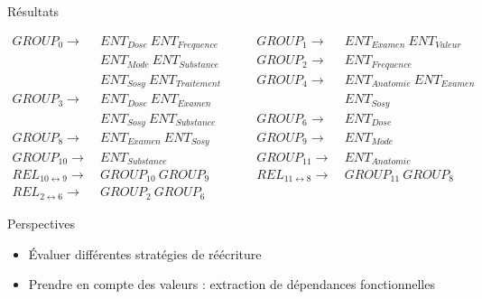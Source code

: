 \begin{frame}{Résultats}
    \begin{adjustbox}{max width=.9\textwidth}
        \centering
        \parbox{\linewidth}{\begin{align*}
            GROUP_0                     \to & ~ ENT_{Dose} ~ ENT_{Frequence}  & \qquad GROUP_1                    \to & ~ ENT_{Examen} ~ ENT_{Valeur}   \\
                                            & ~ ENT_{Mode} ~ ENT_{Substance}  & \qquad GROUP_2                    \to & ~ ENT_{Frequence}               \\
                                            & ~ ENT_{Sosy} ~ ENT_{Traitement} & \qquad GROUP_4                    \to & ~ ENT_{Anatomie} ~ ENT_{Examen} \\
            GROUP_3                     \to & ~ ENT_{Dose} ~ ENT_{Examen}     & \qquad                                & ~ ENT_{Sosy}                    \\
                                            & ~ ENT_{Sosy} ~ ENT_{Substance}  & \qquad GROUP_6                    \to & ~ ENT_{Dose}                    \\
            GROUP_8                     \to & ~ ENT_{Examen} ~ ENT_{Sosy}     & \qquad GROUP_9                    \to & ~ ENT_{Mode}                    \\
            GROUP_{10}                  \to & ~ ENT_{Substance}               & \qquad GROUP_{11}                 \to & ~ ENT_{Anatomie}                \\
            REL_{10 \leftrightarrow 9}  \to & ~ GROUP_{10} ~ GROUP_9          & \qquad REL_{11 \leftrightarrow 8} \to & ~ GROUP_{11} ~ GROUP_8          \\
            REL_{2 \leftrightarrow 6}   \to & ~ GROUP_2 ~ GROUP_6
        \end{align*}}
    \end{adjustbox}

    \vfill\pause

    \begin{block}{Perspectives}
        \begin{itemize}
            \item Évaluer différentes stratégies de réécriture
            \item Prendre en compte des valeurs : extraction de dépendances fonctionnelles \cite{papenbrockFunctionalDependencyDiscovery2015}
        \end{itemize}
    \end{block}
\end{frame}
